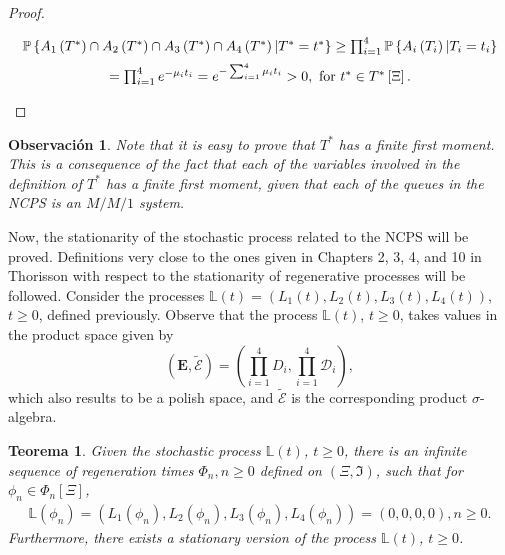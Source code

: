 \documentclass{article}
\newtheorem{Teo}{Teorema}
\newtheorem{Remark}{Observación}
\newcommand{\prob}{\mathbb{P}}
\begin{document}
\begin{proof}
\begin{itemize}
\begin{eqnarray}
\begin{array}{c}\medskip
\prob\left\{A_{1}\left(T^{*}\right)\cap A_{2}\left(T^{*}\right)\cap
A_{3}\left(T^{*}\right)\cap A_{4}\left(T^{*}\right)
|T^{*}=t^{*}\right\}\geq\prod_{i=1}^{4}
\prob\left\{A_{i}\left(T_{i}\right)
|T_{i}=t_{i}\right\}\\
=\prod_{i=1}^{4}e^{-\mu_{i}t_{i}}
=e^{-\sum_{i=1}^{4}\mu_{i}t_{i}}>0,\textrm{ for }t^{*}\in T^{*}\left[\Xi\right].
\end{array}
\end{eqnarray}
\end{itemize}%
\end{proof}
\begin{Remark}\label{Obs.Primer.Momento.Finito}
Note that it is easy to prove that $T^{*}$ has a finite first moment. This is a consequence of the fact that each of the variables involved in the definition of $T^{*}$ has a finite first moment, given that each of the queues in the NCPS is an $M/M/1$ system.
\end{Remark}
Now, the stationarity of the stochastic process related to the NCPS will be proved. Definitions very close to the ones given in Chapters 2, 3, 4, and 10 in Thorisson \cite{Thorisson} with respect to the stationarity of regenerative processes will be followed. Consider the processes $\mathbb{L}\left(t\right)=\left(L_{1}\left(t\right),L_{2}\left(t\right),L_{3}\left(t\right),L_{4}\left(t\right)\right)$, $t\geq0$, defined previously. Observe that the process $\mathbb{L}\left(t\right)$, $t\geq0$, takes values in the product space given by $$\left(\mathbf{E},\tilde{\mathcal{E}}\right)=\left(\prod_{i=1}^{4}D_{i},\prod_{i=1}^{4}\mathcal{D}_{i}\right),$$ which also results to be a polish space, and $\tilde{\mathcal{E}}$ is the corresponding product $\sigma$-algebra. 
\begin{Teo}\label{Tma.Stability.Regenerative.Process}
Given the stochastic process $\mathbb{L}\left(t\right)$, $t\geq0$, there is an infinite sequence of regeneration times $\Phi_{n},n\geq0$ defined on $\left(\Xi,\Im\right)$, such that for $\phi_{n}\in \Phi_{n}\left[\Xi\right]$,
\begin{eqnarray}\label{Eq.Regeneracion}
\mathbb{L}\left(\phi_{n}\right)=\left(L_{1}\left(\phi_{n}\right),L_{2}\left(\phi_{n}\right),L_{3}\left(\phi_{n}\right),L_{4}\left(\phi_{n}\right)\right)=\left(0,0,0,0\right),n\geq0.
\end{eqnarray}
Furthermore, there exists a stationary version of the process $\mathbb{L}\left(t\right)$, $t\geq0$.
\end{Teo}
\end{document}
